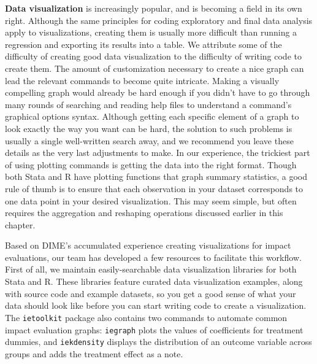 \textbf{Data visualization} is increasingly popular,
and is becoming a field in its own right.
Although the same principles for coding exploratory and final data analysis apply to visualizations,
creating them is usually more difficult than running a regression and exporting its results into a table.
We attribute some of the difficulty of creating good data visualization
to the difficulty of writing code to create them.
The amount of customization necessary to create a nice graph can lead the relevant commands to become quite intricate.	
Making a visually compelling graph would already be hard enough if
you didn't have to go through many rounds of searching and reading help files
to understand a command's graphical options syntax.
Although getting each specific element of a graph to look exactly the way you want can be hard,
the solution to such problems is usually a single well-written search away,
and we recommend you leave these details as the very last adjustments to make.
In our experience, the trickiest part of using plotting commands is getting the data into the right format.
Though both Stata and R have plotting functions that graph summary statistics,
a good rule of thumb is to ensure that each
observation in your dataset corresponds to one data point in your desired visualization.
This may seem simple,
but often requires the aggregation and reshaping operations
discussed earlier in this chapter.

Based on DIME's accumulated experience creating visualizations for impact evaluations,
our team has developed a few resources to facilitate this workflow.
First of all, we maintain easily-searchable data visualization libraries for both Stata and R.
These libraries feature curated data visualization examples, along with source code and example datasets,
so you get a good sense of what your data should look like
before you can start writing code to create a visualization.
The \texttt{ietoolkit} package also contains two commands to automate
common impact evaluation graphs:
\texttt{iegraph}
plots the values of coefficients for treatment dummies,
and \texttt{iekdensity} displays the distribution of an outcome variable
across groups and adds the treatment effect as a note.




